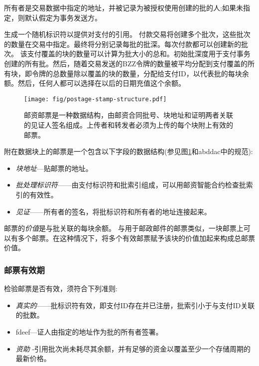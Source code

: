 所有者是交易数据中指定的地址，并被记录为被授权使用创建的批的人;如果未指定，则默认假定为事务发送方。

生成一个随机标识符以提供对支付的引用。
付款交易将创建多个批次，这些批次的数量在交易中指定。最终将分别记录每批的批深。每次付款都可以创建新的批次。
该支付覆盖的块的数量可以计算为批大小的总和。初始批深度用于支付事务创建的所有批。然后，随着交易发送的BZZ令牌的数量被平均分配到支付覆盖的所有块，即令牌的总数量除以覆盖的块的数量，分配给支付ID，以代表批的每块余额。然后，任何人都可以选择在以后的日期充值这个余额。 


\begin{figure}[htbp]
  \centering
    \texttt{[image: fig/postage-stamp-structure.pdf]}
  \caption[邮票\statusgreen]{邮资邮票是一种数据结构，由邮资合同批号、块地址和证明两者关联的见证人签名组成。上传者和转发者必须为上传的每个块附上有效的邮票。 }
  \label{fig:postage-stamp}
\end{figure}


附在数据块上的邮票是一个包含以下字段的数据结构(参见图\ref{fig:postage-stamp}和abddac中的规范):

\begin{itemize}
    \item \emph{块地址}—贴邮票的地址。 
    \item \emph{批处理标识符}——由支付标识符和批索引组成，可以用邮资智能合约检查批索引的有效性。
    \item \emph{见证}——所有者的签名，将批标识符和所有者的地址连接起来。
\end{itemize}

邮票的\emph{价值}是与批关联的每块余额。
与用于邮政邮件的邮票类似，一块邮票上可以有多个邮票。在这种情况下，将多个有效邮票赋予该块的价值加起来构成总邮票价值。 

\subsubsection{邮票有效期}

检验邮票是否有效，须符合下列准则:

\begin{itemize}
\item \emph{真实的}——批标识符有效，即支付ID存在并已注册，批索引小于与支付ID关联的批数。
\item fdeef—证人由指定的地址作为批的所有者签署。
\item \emph{资助} -引用批次尚未耗尽其余额，并有足够的资金以覆盖至少一个存储周期的最新价格。
\end{itemize}

